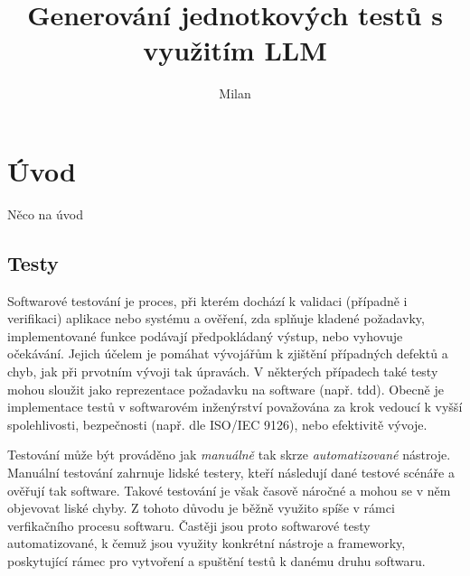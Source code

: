 \documentclass[czech, ma, kiv, he, iso690alph, pdf, viewonly]{fasthesis}
\title{Generování jednotkových testů s využitím LLM}
\author{Milan}{Horínek}{Bc.}{}
\begin{document}
\frontpages[tm] %
\tableofcontents
% 
%
\makeatletter%
\ifx\FASThesis@style\c@fullcolor%
\else%
\fi%
\makeatother%

\setlength{\parskip}{1em}


\chapter{Úvod}
    Něco na úvod

    
    \section{Testy}

    Softwarové testování je proces, při kterém dochází k validaci (případně i verifikaci) aplikace nebo systému a ověření, zda splňuje kladené požadavky, implementované funkce podávají předpokládaný výstup, nebo vyhovuje očekávání. Jejich účelem je pomáhat vývojářům k zjištění případných defektů a chyb, jak při prvotním vývoji tak úpravách. V některých případech také testy mohou sloužit jako reprezentace požadavku na software (např. \Acrshort{tdd}). Obecně je implementace testů v softwarovém inženýrství považována za krok vedoucí k vyšší spolehlivosti, bezpečnosti (např. dle ISO/IEC 9126), nebo efektivitě vývoje.

    Testování může být prováděno jak \textit{manuálně} tak skrze \textit{automatizované} nástroje. Manuální testování zahrnuje lidské testery, kteří následují dané testové scénáře a ověřují tak software. Takové testování je však časově náročné a mohou se v něm objevovat liské chyby. Z tohoto důvodu je běžně využito spíše v rámci verfikačního procesu softwaru. Častěji jsou proto softwarové testy automatizované, k čemuž jsou využity konkrétní nástroje a frameworky, poskytující rámec pro vytvoření a spuštění testů k danému druhu softwaru. \cite{geeksforgeeks2023testingtypes}
\end{document}
